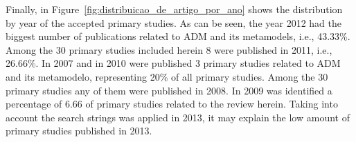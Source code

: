 Finally, in Figure~\ref{fig:distribuicao_de_artigo_por_ano} shows the distribution by year of the accepted primary studies. As can be seen, the year 2012 had the biggest number of publications related to ADM and its metamodels, i.e., 43.33\%. Among the 30 primary studies included herein 8 were published in 2011, i.e., 26.66\%. In 2007 and in 2010 were published 3 primary studies related to ADM and its metamodelo, representing 20\% of all primary studies. Among the 30 primary studies any of them were published in 2008. In 2009 was identified a percentage of 6.66 of primary studies related to the review herein. Taking into account the search strings was applied in 2013, it may explain the low amount of primary studies published in 2013. 


